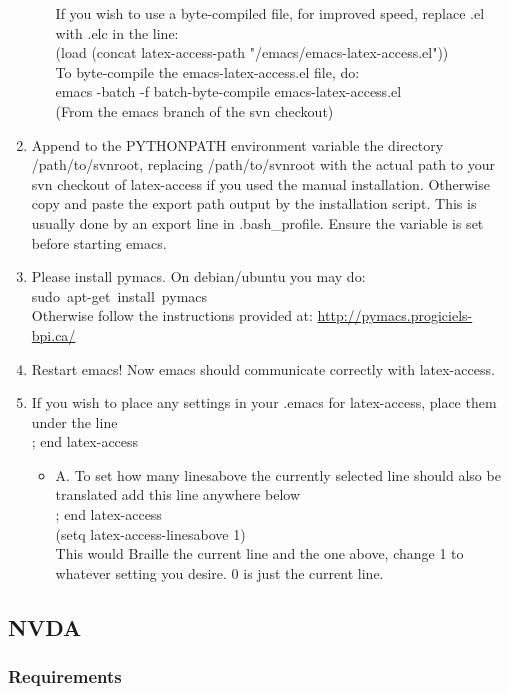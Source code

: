 \documentclass[12pt,a4paper]{report}
\begin{document}
\begin{enumerate}
\begin{itemize}
If you wish to use a byte-compiled file, for improved speed, replace .el
with .elc in the line:\\
(load (concat latex-access-path "/emacs/emacs-latex-access.el"))\\

To byte-compile the emacs-latex-access.el file, do:\\
emacs -batch -f batch-byte-compile emacs-latex-access.el\\
(From the emacs branch of the svn checkout)
\end{itemize}
\item 
Append to the PYTHONPATH environment variable the directory
/path/to/svnroot, replacing /path/to/svnroot with the actual path to
your svn checkout of latex-access if you used the manual
installation. Otherwise copy and paste the export path output by the
installation script.
This is usually done by an export line in .bash\_profile.
Ensure the variable is set before starting emacs.
\item Please install pymacs. 
On debian/ubuntu you may do:\\
\mbox{sudo apt-get install pymacs}\\
Otherwise follow the instructions provided at:
\url{http://pymacs.progiciels-bpi.ca/}
\item Restart emacs!
Now emacs should communicate correctly with latex-access.
\item If you wish to place any settings in your .emacs for latex-access,
place them under the line \\
; end latex-access\\
\begin{itemize}
\item A. To set how many linesabove the currently selected line should also be
translated add this line anywhere below\\
; end latex-access \\
(setq latex-access-linesabove 1)\\
This would Braille the current line and the one above, change 1 to
whatever setting you desire. 0 is just the current line.
\end{itemize}
\end{enumerate}

\subsection{NVDA}
\label{subsubchap-nvda}

\subsubsection{Requirements}
\end{document}

